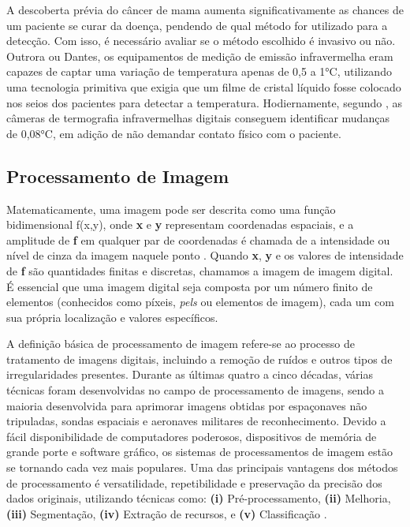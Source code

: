 A descoberta prévia do câncer de mama aumenta significativamente as chances de um paciente se curar da doença, pendendo de qual método for utilizado para a detecção. Com isso, é necessário avaliar se o método escolhido é invasivo ou não. Outrora ou Dantes, os equipamentos de medição de emissão infravermelha eram capazes de captar uma variação de temperatura apenas de 0,5 a 1°C, utilizando uma tecnologia primitiva que exigia que um filme de cristal líquido fosse colocado nos seios dos pacientes para detectar a temperatura. Hodiernamente, segundo , as câmeras de termografia infravermelhas digitais conseguem identificar mudanças de 0,08°C, em adição de não demandar contato físico com o paciente.





\subsection{\esp Processamento de Imagem}

Matematicamente, uma imagem pode ser descrita como uma função bidimensional f(x,y), onde \textbf{x} e \textbf{y} representam coordenadas espaciais, e a amplitude de \textbf{f} em qualquer par de coordenadas é chamada de a intensidade ou nível de cinza da imagem naquele ponto \cite{techniques}. Quando \textbf{x}, \textbf{y} e os valores de intensidade de \textbf{f} são quantidades finitas e discretas, chamamos a imagem de imagem digital. É essencial que uma imagem digital seja composta por um número finito de elementos (conhecidos como píxeis, \textit{pels} ou elementos de imagem), cada um com sua própria localização e valores específicos. 

A definição básica de processamento de imagem refere-se ao processo de tratamento de imagens digitais, incluindo a remoção de ruídos e outros tipos de irregularidades presentes. Durante as últimas quatro a cinco décadas, várias técnicas foram desenvolvidas no campo de processamento de imagens, sendo a maioria desenvolvida para aprimorar imagens obtidas por espaçonaves não tripuladas, sondas espaciais e aeronaves militares de reconhecimento. Devido a fácil disponibilidade de computadores poderosos, dispositivos de memória de grande porte e software gráfico, os sistemas de processamentos de imagem estão se tornando cada vez mais populares. Uma das principais vantagens dos métodos de processamento é versatilidade, repetibilidade e preservação da precisão dos dados originais, utilizando técnicas como: \textbf{(i)} Pré-processamento, \textbf{(ii)} Melhoria, \textbf{(iii)} Segmentação, \textbf{(iv)} Extração de recursos, e \textbf{(v)} Classificação \cite{lungcancer}.


